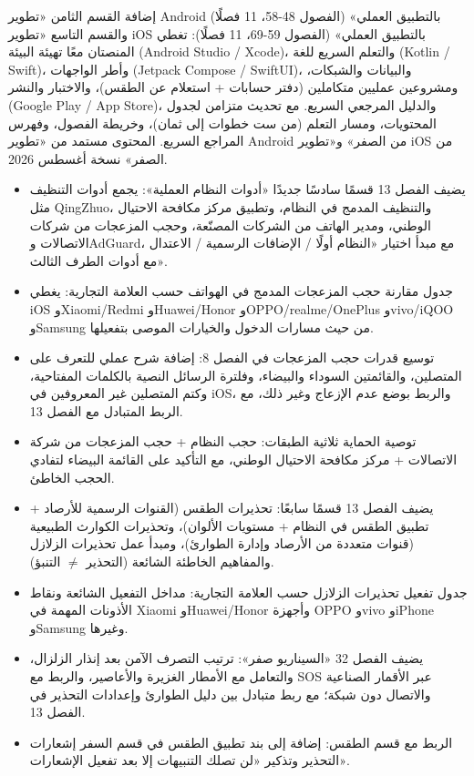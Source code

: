 إضافة القسم الثامن «تطوير Android بالتطبيق العملي» (الفصول 48-58، 11 فصلًا) والقسم التاسع «تطوير iOS بالتطبيق العملي» (الفصول 59-69، 11 فصلًا): تغطي المنصتان معًا تهيئة البيئة (Android Studio / Xcode)، والتعلم السريع للغة (Kotlin / Swift)، وأطر الواجهات (Jetpack Compose / SwiftUI)، والبيانات والشبكات، ومشروعين عمليين متكاملين (دفتر حسابات + استعلام عن الطقس)، والاختبار والنشر (Google Play / App Store)، والدليل المرجعي السريع. مع تحديث متزامن لجدول المحتويات، ومسار التعلم (من ست خطوات إلى ثمان)، وخريطة الفصول، وفهرس المراجع السريع. المحتوى مستمد من «تطوير Android من الصفر» و«تطوير iOS من الصفر» نسخة أغسطس 2026.


\begin{itemize}
  \item يضيف الفصل 13 قسمًا سادسًا جديدًا «أدوات النظام العملية»: يجمع أدوات التنظيف مثل QingZhuo، والتنظيف المدمج في النظام، وتطبيق مركز مكافحة الاحتيال الوطني، ومدير الهاتف من الشركات المصنّعة، وحجب المزعجات من شركات الاتصالات وAdGuard، مع مبدأ اختيار «النظام أولًا / الإضافات الرسمية / الاعتدال مع أدوات الطرف الثالث».
  \item جدول مقارنة حجب المزعجات المدمج في الهواتف حسب العلامة التجارية: يغطي iOS وXiaomi/Redmi وHuawei/Honor وOPPO/realme/OnePlus وvivo/iQOO وSamsung من حيث مسارات الدخول والخيارات الموصى بتفعيلها.
  \item توسيع قدرات حجب المزعجات في الفصل 8: إضافة شرح عملي للتعرف على المتصلين، والقائمتين السوداء والبيضاء، وفلترة الرسائل النصية بالكلمات المفتاحية، وكتم المتصلين غير المعروفين في iOS، والربط بوضع عدم الإزعاج وغير ذلك، مع الربط المتبادل مع الفصل 13.
  \item توصية الحماية ثلاثية الطبقات: حجب النظام + حجب المزعجات من شركة الاتصالات + مركز مكافحة الاحتيال الوطني، مع التأكيد على القائمة البيضاء لتفادي الحجب الخاطئ.
\end{itemize}


\begin{itemize}
  \item يضيف الفصل 13 قسمًا سابعًا: تحذيرات الطقس (القنوات الرسمية للأرصاد + تطبيق الطقس في النظام + مستويات الألوان)، وتحذيرات الكوارث الطبيعية (قنوات متعددة من الأرصاد وإدارة الطوارئ)، ومبدأ عمل تحذيرات الزلازل والمفاهيم الخاطئة الشائعة (التحذير $\neq$ التنبؤ).
  \item جدول تفعيل تحذيرات الزلازل حسب العلامة التجارية: مداخل التفعيل الشائعة ونقاط الأذونات المهمة في Xiaomi وHuawei/Honor وأجهزة OPPO وvivo وiPhone وSamsung وغيرها.
  \item يضيف الفصل 32 «السيناريو صفر»: ترتيب التصرف الآمن بعد إنذار الزلزال، والتعامل مع الأمطار الغزيرة والأعاصير، والربط مع SOS عبر الأقمار الصناعية والاتصال دون شبكة؛ مع ربط متبادل بين دليل الطوارئ وإعدادات التحذير في الفصل 13.
  \item الربط مع قسم الطقس: إضافة إلى بند تطبيق الطقس في قسم السفر إشعارات التحذير وتذكير «لن تصلك التنبيهات إلا بعد تفعيل الإشعارات».
\end{itemize}

